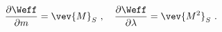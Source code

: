 \begin{equation}
\frac{\partial \Weff}{\partial m}= \vev{M}_S ~, \quad 
\frac{\partial \Weff}{\partial \lambda}= \vev{M^2}_S ~.
\end{equation}

